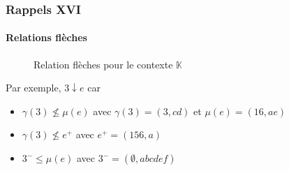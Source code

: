 \documentclass[french]{beamer}
\def\KK{\mathbb{K}}
\begin{document}
\begin{frame}
\frametitle{Rappels XVI}
\framesubtitle{Relations flèches}
\begin{figure}[h]
\label{cap:fig:arrow}
\begin{center}
\begin{cxt}%
\cxtName{}%
%
%
%
%
%
%
\end{cxt}
\end{center}
\caption{Relation flèches pour le contexte $\KK$}
\end{figure}
Par exemple, $3 \downarrow e$ car 
\begin{itemize}
\item $\gamma(3) \not\leq \mu(e)$ avec $\gamma(3)= (3, cd)$ et $\mu(e)=(16, ae)$
\item $\gamma(3) \not\leq e^+$ avec $e^+ = (156,a)$
\item $3^- \leq \mu(e)$ avec $3^-=(\emptyset, abcdef)$
\end{itemize}
\end{frame}

\end{document}
